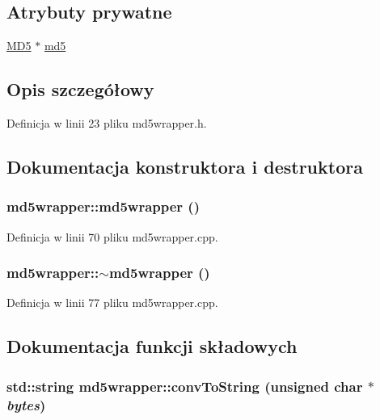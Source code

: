\subsection*{Atrybuty prywatne}
\begin{CompactItemize}
\item 
\hyperlink{a00002}{MD5} $\ast$ \hyperlink{a00004_fe675f7d8993ec64ddefa902dff431fa}{md5}
\end{CompactItemize}


\subsection{Opis szczegółowy}


Definicja w linii 23 pliku md5wrapper.h.

\subsection{Dokumentacja konstruktora i destruktora}
\hypertarget{a00004_ae8138b76b89d93a4c21077b76d57c07}{
\subsubsection[{md5wrapper}]{\setlength{\rightskip}{0pt plus 5cm}md5wrapper::md5wrapper ()}}
\label{d0/d0b/a00004_ae8138b76b89d93a4c21077b76d57c07}




Definicja w linii 70 pliku md5wrapper.cpp.\hypertarget{a00004_65e78258ad508d83be81d395f8bd43f4}{
\subsubsection[{$\sim$md5wrapper}]{\setlength{\rightskip}{0pt plus 5cm}md5wrapper::$\sim$md5wrapper ()}}
\label{d0/d0b/a00004_65e78258ad508d83be81d395f8bd43f4}




Definicja w linii 77 pliku md5wrapper.cpp.

\subsection{Dokumentacja funkcji składowych}
\hypertarget{a00004_74f856c53740d3beb133074baffd21aa}{
\subsubsection[{convToString}]{\setlength{\rightskip}{0pt plus 5cm}std::string md5wrapper::convToString (unsigned char $\ast$ {\em bytes})}}
\label{d0/d0b/a00004_74f856c53740d3beb133074baffd21aa}





